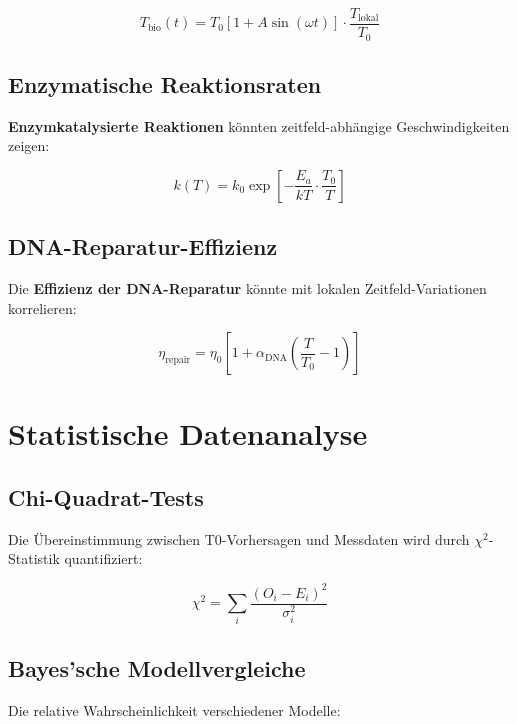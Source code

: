 \documentclass[12pt,a4paper]{report}
\begin{document}
	\begin{equation}
		T_{\text{bio}}(t) = T_0[1 + A\sin(\omega t)] \cdot \frac{T_{\text{lokal}}}{T_0}
	\end{equation}
	
	\subsection{Enzymatische Reaktionsraten}
	
	\textbf{Enzymkatalysierte Reaktionen} könnten zeitfeld-abhängige Geschwindigkeiten zeigen:
	
	\begin{equation}
		k(T) = k_0 \exp\left[-\frac{E_a}{kT} \cdot \frac{T_0}{T}\right]
	\end{equation}
	
	\subsection{DNA-Reparatur-Effizienz}
	
	Die \textbf{Effizienz der DNA-Reparatur} könnte mit lokalen Zeitfeld-Variationen korrelieren:
	
	\begin{equation}
		\eta_{\text{repair}} = \eta_0 \left[1 + \alpha_{\text{DNA}}\left(\frac{T}{T_0} - 1\right)\right]
	\end{equation}
	
	\section{Statistische Datenanalyse}
	
	\subsection{Chi-Quadrat-Tests}
	
	Die Übereinstimmung zwischen T0-Vorhersagen und Messdaten wird durch $\chi^2$-Statistik quantifiziert:
	
	\begin{equation}
		\chi^2 = \sum_i \frac{(O_i - E_i)^2}{\sigma_i^2}
	\end{equation}
	
	\subsection{Bayes'sche Modellvergleiche}
	
	Die relative Wahrscheinlichkeit verschiedener Modelle:
	
\end{document}

